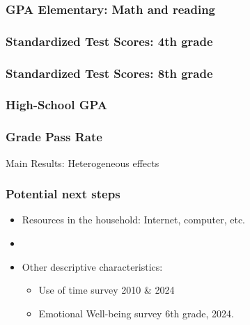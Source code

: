 \documentclass{beamer}
\begin{document}
\begin{frame}
    \label{ece_4p}
    \frametitle{GPA Elementary: Math and reading}
        {
  }  
\end{frame}







\begin{frame}
    \label{ece_4p}
    \frametitle{Standardized Test Scores: 4th grade}
        {
  }  
\end{frame}

\begin{frame}
    \label{ece_2s}
    \frametitle{Standardized Test Scores: 8th grade}
        {
  }  
\end{frame}


\begin{frame}
    \label{gpa}
    \frametitle{High-School GPA}
        {
  }  
\end{frame}

\begin{frame}
    \label{pass}
    \frametitle{Grade Pass Rate}
        {
  }  
\end{frame}



\begin{section}
    {Main Results: Heterogeneous effects}
\end{section}


\begin{frame}
    \label{pass}
    \frametitle{Potential next steps}
       \begin{itemize}
           \item Resources in the household: Internet, computer, etc.
           \item 
           \item Other descriptive characteristics:
            \begin{itemize}
                \item  Use of time survey 2010 & 2024
                \item Emotional Well-being survey 6th grade, 2024.
            \end{itemize}
       \end{itemize}
    
\end{frame}
\end{document}
